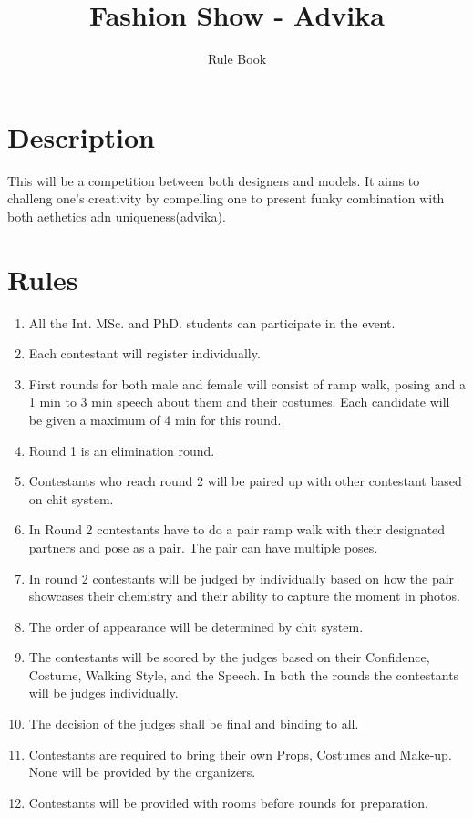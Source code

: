 \documentclass[a4paper, 11pt]{proc}
\begin{document}
\title{Fashion Show - Advika}
\author{Rule Book}
\maketitle

\section*{Description}
This will be a competition between both designers and models. It aims to challeng one's creativity by compelling one to present funky combination with both aethetics adn uniqueness(advika).
\section*{Rules}
\begin{enumerate}
	\item All the Int. MSc. and PhD. students can participate in the event.
	\item Each contestant will register individually.
	\item First rounds for both male and female will consist of ramp walk, posing and a 1 min to 3 min speech about them and their costumes. Each candidate will be given a maximum of 4 min for this round.
	\item Round 1 is an elimination round.
	\item Contestants who reach round 2 will be paired up with other contestant based on chit system.
	\item In Round 2 contestants have to do a pair ramp walk with their designated partners and pose as a pair. The pair can have multiple poses.
	\item In round 2 contestants will be judged by individually based on how the pair showcases their chemistry and their ability to capture the moment in photos.
	\item The order of appearance will be determined by chit system.
	\item The contestants will be scored by the judges based on their Confidence, Costume, Walking Style, and the Speech. In both the rounds the contestants will be judges individually.
	\item The decision of the judges shall be final and binding to all.
	\item Contestants are required to bring their own Props, Costumes and Make-up. None will be provided by the organizers.
	\item Contestants will be provided with rooms before rounds for preparation.

\end{enumerate}
\end{document}
